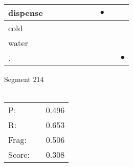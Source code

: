 \documentclass[landscape]{article}
\newcommand{\ssp}{\hspace{2pt}}
\newcommand{\mex}{\cellcolor{g}$\bullet$}
\begin{document}
\begin{tabular}{|l|p{10pt}|p{10pt}|p{10pt}|p{10pt}|p{10pt}|p{10pt}|p{10pt}|p{10pt}|p{10pt}|}
\hline
\ssp \cellcolor{ref6}dispense \ssp&\hspace{2pt}&\hspace{2pt}&\hspace{2pt}&\hspace{2pt}&\hspace{2pt}&\hspace{2pt}&\hspace{2pt}\mex&\hspace{2pt}&\hspace{2pt}\\
\hline
\ssp cold \ssp&\hspace{2pt}&\hspace{2pt}&\hspace{2pt}&\hspace{2pt}&\hspace{2pt}&\hspace{2pt}&\hspace{2pt}&\hspace{2pt}&\hspace{2pt}\\
\hline
\ssp water \ssp&\hspace{2pt}&\hspace{2pt}&\hspace{2pt}&\hspace{2pt}&\hspace{2pt}&\hspace{2pt}&\hspace{2pt}&\hspace{2pt}&\hspace{2pt}\\
\hline
\ssp \cellcolor{ref8}. \ssp&\hspace{2pt}&\hspace{2pt}&\hspace{2pt}&\hspace{2pt}&\hspace{2pt}&\hspace{2pt}&\hspace{2pt}&\hspace{2pt}&\hspace{2pt}\mex\\
\hline
\end{tabular}

\vspace{6pt}
\noindent Segment 214\\\\
\noindent\begin{tabular}{lm{12pt}r}
\hline
P:&&0.496\\
R:&&0.653\\
Frag:&&0.506\\
Score:&&0.308\\
\end{tabular}
\end{document}
